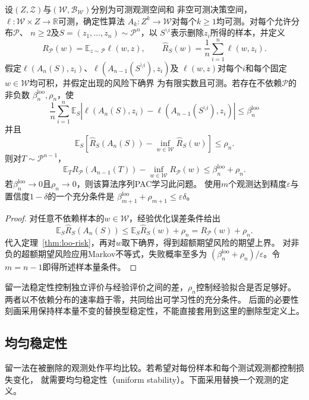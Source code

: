 \begin{theorem}[留一法稳定性与可学习性]
\label{thm:loo-learning}
设$(Z,\mathcal Z)$与$(\mathcal W,\mathcal B_{\mathcal W})$分别为可测观测空间和
非空可测决策空间，$\ell:\mathcal W\times Z\to\mathbb R$可测，确定性算法
$A_k:Z^k\to\mathcal W$对每个$k\geq1$均可测。对每个允许分布$\mathcal P$、
$n\geq2$及$S=(z_1,\ldots,z_n)\sim\mathcal P^n$，以
$S^{\setminus i}$表示删除$z_i$所得的样本，并定义
\[
 R_{\mathcal P}(w)=\mathbb E_{z\sim\mathcal P}\ell(w,z),
 \qquad
 \hat R_S(w)=\frac1n\sum_{i=1}^n\ell(w,z_i).
\]
假定$\ell(A_n(S),z_i)$、$\ell(A_{n-1}(S^{\setminus i}),z_i)$及
$\ell(w,z)$对每个$i$和每个固定$w\in\mathcal W$均可积，并假定出现的风险下确界
为有限实数且可测。若存在不依赖$\mathcal P$的非负数
$\beta_n^{\mathrm{loo}},\rho_n$，使
\[
 \frac1n\sum_{i=1}^n\mathbb E_S
 \left|\ell(A_n(S),z_i)-\ell(A_{n-1}(S^{\setminus i}),z_i)\right|
 \leq\beta_n^{\mathrm{loo}}
\]
并且
\[
 \mathbb E_S\left[\hat R_S(A_n(S))-\inf_{w\in\mathcal W}\hat R_S(w)\right]
 \leq\rho_n.
\]
则对$T\sim\mathcal P^{n-1}$，
\[
 \mathbb E_T R_{\mathcal P}(A_{n-1}(T))-
 \inf_{w\in\mathcal W}R_{\mathcal P}(w)
 \leq\beta_n^{\mathrm{loo}}+\rho_n.
\]
若$\beta_n^{\mathrm{loo}}\to0$且$\rho_n\to0$，则该算法序列PAC学习此问题。
使用$m$个观测达到精度$\varepsilon$与置信度$1-\delta$的一个充分条件是
$\beta_{m+1}^{\mathrm{loo}}+\rho_{m+1}\leq\varepsilon\delta$。
\end{theorem}
\begin{proof}
对任意不依赖样本的$w\in\mathcal W$，经验优化误差条件给出
\[
 \mathbb E_S\hat R_S(A_n(S))
 \leq\mathbb E_S\hat R_S(w)+\rho_n=R_{\mathcal P}(w)+\rho_n.
\]
代入定理~\ref{thm:loo-risk}，再对$w$取下确界，得到超额期望风险的期望上界。
对非负的超额期望风险应用Markov不等式，失败概率至多为
$(\beta_n^{\mathrm{loo}}+\rho_n)/\varepsilon$。令$m=n-1$即得所述样本量条件。
\end{proof}

留一法稳定性控制独立评价与经验评价之间的差，$\rho_n$控制经验拟合是否足够好。
两者以不依赖分布的速率趋于零，共同给出可学习性的充分条件。
后面的必要性刻画采用保持样本量不变的替换型稳定性，不能直接套用到这里的删除型定义上。

\subsection{均匀稳定性}
\label{sec:stability-characterization}

留一法在被删除的观测处作平均比较。若希望对每份样本和每个测试观测都控制损失变化，
就需要均匀稳定性（uniform stability）。下面采用替换一个观测的定义。


